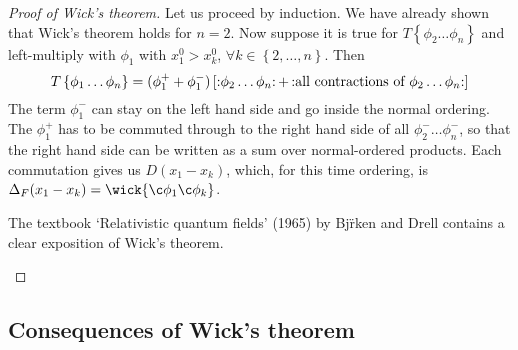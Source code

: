 \begin{proof}[Proof of Wick's theorem]
  Let us proceed by induction. We have already shown that Wick's theorem holds for $n = 2$. 
  Now suppose it is true for $T \left\{ \phi_2 \dots \phi_n \right\}$ and left-multiply with $\phi_1$ with $x_1^0 > x_k^0$, $\forall k \in \left\{ 2, \dots, n \right\}$.
  Then 
  \begin{equation}
    T \left\{ \phi_1 \dots \phi_n \right\} = (\phi^+_1 + \phi^-_1) \left[ \mathop{:}\nolimits\!\phi_2 \dots \phi_n \!\mathop{:}\nolimits + \mathop{:}\nolimits\!\text{all contractions of }\phi_2 \dots \phi_n \!\mathop{:}\nolimits \right]
  \end{equation}
  The term $\phi^-_1$ can stay on the left hand side and go inside the normal ordering. The $\phi^+_1$ has to be commuted through to the right hand side of all $\phi^-_2 \dots \phi^-_n$, so that the right hand side can be written as a sum over normal-ordered products.
  Each commutation gives us $D(x_1 - x_k)$, which, for this time ordering, is $\Delta_F(x_1 - x_k) = \wick{\c\phi_1 \c\phi_k}$.
  \begin{leftbar}
    \begin{remark}
      The textbook `Relativistic quantum fields' (1965) by Bj\"rken and Drell contains a clear exposition of Wick's theorem.
    \end{remark}
  \end{leftbar}
\end{proof}

\subsection{Consequences of Wick's theorem}%
\label{sub:consequences_of_wick_s_theorem}

